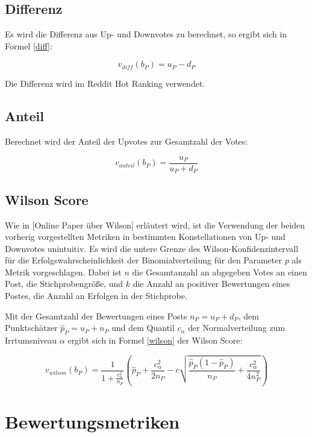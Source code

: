 \subsection{Differenz}

Es wird die Differenz aus Up- und Downvotes zu berechnet, so ergibt sich in Formel \ref{diff}:

\begin{equation}
\label{diff}
v_{diff}(b_P) = u_P - d_P
\end{equation}

Die Differenz wird im Reddit Hot Ranking verwendet.

\subsection{Anteil}

Berechnet wird der Anteil der Upvotes zur Gesamtzahl der Votes:

\begin{equation}
\label{anteil}
v_{anteil}(b_P) = \frac{u_P}{u_P + d_P}
\end{equation}


\subsection{Wilson Score}

Wie in [Online Paper über Wilson] erläutert wird, ist die Verwendung der beiden vorherig vorgestellten Metriken in bestimmten Konstellationen von Up- und Downvotes unintuitiv. Es wird  die untere Grenze des Wilson-Konfidenzintervall für die Erfolgswahrscheinlichkeit der Binomialverteilung für den Parameter $p$ als Metrik vorgeschlagen. Dabei ist $n$ die Gesamtanzahl an abgegeben Votes an einen Post, die Stichprobengröße, und $k$ die Anzahl an positiver Bewertungen eines Postes, die Anzahl an Erfolgen in der Stichprobe.
	
Mit der Gesamtzahl der Bewertungen eines Posts $n_P = u_P + d_P$, dem Punktschätzer $\hat{p}_P = u_P + n_P$ und dem Quantil $c_{\alpha}$ der Normalverteilung zum Irrtumsniveau $\alpha$ ergibt sich in Formel \ref{wilson} der Wilson Score:

\begin{equation}
\label{wilson}
 v_{wilson}(b_P) = \frac{1}{1+\frac{c_{\alpha}^2}{n_P}}(\hat{p}_P + \frac{c_{\alpha}^2}{2n_P} - c \sqrt{\frac{\hat{p}_P(1 - \hat{p}_P)}{n_P} + \frac{c_{\alpha}^2}{4n_P^2}})
\end{equation}
	
\section{Bewertungsmetriken}

